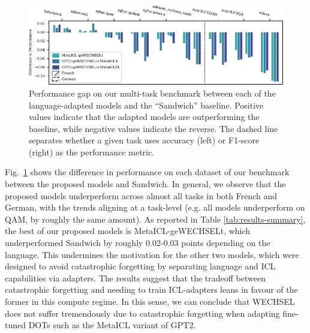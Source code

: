 \documentclass[11pt]{article}
\begin{document}
\begin{figure}[ht]
	\includegraphics{results.pdf}
	\caption{Performance gap on our multi-task benchmark between each of the language-adapted models
		and the ``Sandwich'' baseline. Positive values indicate that the adapted models are
		outperforming the baseline, while negative values indicate the reverse. The dashed line
		separates whether a given task uses accuracy (left) or F1-score (right) as the performance
		metric.}
	\label{fig:results}
\end{figure}

Fig.\@~\ref{fig:results} shows the difference in performance on each dataset of our benchmark
between the proposed models and Sandwich. In general, we observe that the proposed models
underperform across almost all tasks in both French and German, with the trends aligning at
a task-level (e.g. all models underperform on QAM, by roughly the same amount). As reported in Table
\ref{tab:results-summary}, the best of our proposed models is MetaICL-geWECHSELt, which
underperformed Sandwich by roughly 0.02-0.03 points depending on the language. This undermines the
motivation for the other two models, which were designed to avoid catastrophic forgetting by
separating language and ICL capabilities via adapters. The results suggest that the tradeoff between
catastrophic forgetting and needing to train ICL-adapters leans in favour of the former in this
compute regime. In this sense, we can conclude that WECHSEL does not suffer tremendously due to
catastrophic forgetting when adapting fine-tuned DOTs such as the MetaICL variant of GPT2.
\end{document}
